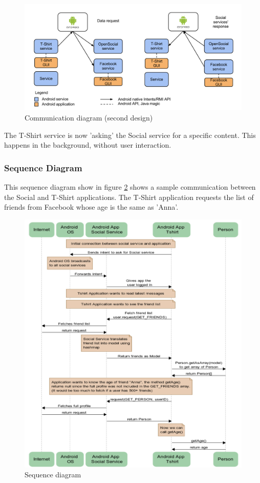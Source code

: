 \begin{figure}[h!]
\centering \includegraphics[scale=0.35]{img/design-reqresp.png}
\caption{Communication diagram (second design)}
\label{fig:design-reqresp}
\end{figure}

The T-Shirt service is now 'asking' the Social service for a specific content.
This happens in the background, without user interaction.

\newpage

\subsubsection{Sequence Diagram}
This sequence diagram show in figure \ref{fig:design-sequence} shows a sample communication between the Social and T-Shirt applications.
The T-Shirt application requests the list of friends from Facebook whose age is the same as 'Anna'.

\begin{figure}[h!]
\centering \includegraphics[width=1.0\textwidth]{img/design-sequence.png}
\caption{Sequence diagram}
\label{fig:design-sequence}
\end{figure}

